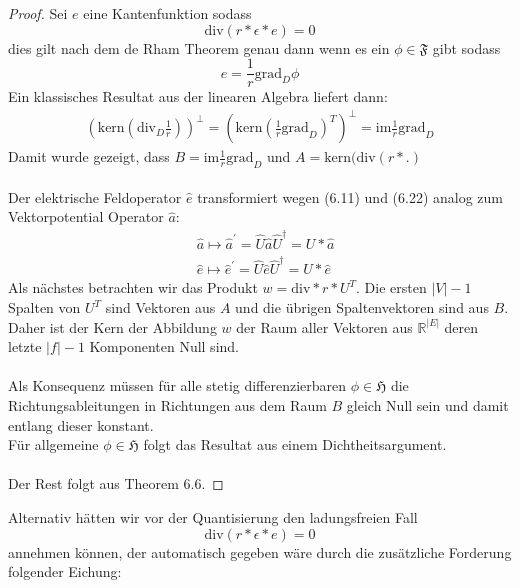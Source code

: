 \documentclass[11pt,a4paper,leqno]{report}
\numberwithin{equation}{chapter}
\begin{document}
\begin{proof}
	Sei $e$ eine Kantenfunktion sodass 
	\begin{equation*}
		\text{div}(r * \epsilon * e) = 0
	\end{equation*} dies gilt nach dem de Rham Theorem genau dann wenn es ein $\phi\in\mathfrak{F}$ gibt sodass 
\begin{equation*}
	e = \frac{1}{r}\text{grad}_D\phi
\end{equation*}
Ein klassisches Resultat aus der linearen Algebra liefert dann:
\begin{align*}
	 (\text{kern} (\text{div}_D\frac{1}{r}))^\perp 
	 =(\text{kern}(\frac{1}{r}\text{grad}_D)^T)^\perp =\text{im}\frac{1}{r}\text{grad}_D
\end{align*}
Damit wurde gezeigt, dass $B=\text{im}\frac{1}{r}\text{grad}_D$ und $A=\text{kern}(\text{div}(r*.)$\\
\\
Der elektrische Feldoperator $\hat{e}$ transformiert wegen (6.11) und (6.22) analog zum Vektorpotential Operator $\hat{a}$:
\begin{align}
	&\hat{a} \mapsto \hat{a}^{'} = \hat{U}\hat{a}\hat{U}^\dagger = U * \hat{a}\\
	&\hat{e} \mapsto \hat{e}^{'} = \hat{U}\hat{e}\hat{U}^\dagger = U * \hat{e}
\end{align}
Als n\"achstes betrachten wir das Produkt $w = \text{div} * r * U^T$.
Die ersten $|V| - 1$ Spalten von $U^T$ sind Vektoren aus $A$ und die \"ubrigen Spaltenvektoren sind aus $B$. Daher ist der Kern der Abbildung $w$ der Raum aller Vektoren aus $\mathbb{R}^{|E|}$ deren letzte $|f| - 1$ Komponenten Null sind.\\
\\
Als Konsequenz m\"ussen f\"ur alle stetig differenzierbaren $\phi\in\mathfrak{H}$ die Richtungsableitungen in Richtungen aus dem Raum $B$ gleich Null sein und damit entlang dieser konstant.\\
F\"ur allgemeine $\phi\in\mathfrak{H}$ folgt das Resultat aus einem Dichtheitsargument.\\
\\
Der Rest folgt aus Theorem 6.6.
\end{proof}
\noindent
Alternativ h\"atten wir vor der Quantisierung den ladungsfreien Fall
 \begin{equation}
 	\text{div}(r * \epsilon * e) = 0
 \end{equation}
 annehmen k\"onnen, der automatisch gegeben w\"are durch die zus\"atzliche Forderung folgender Eichung:
\end{document}
